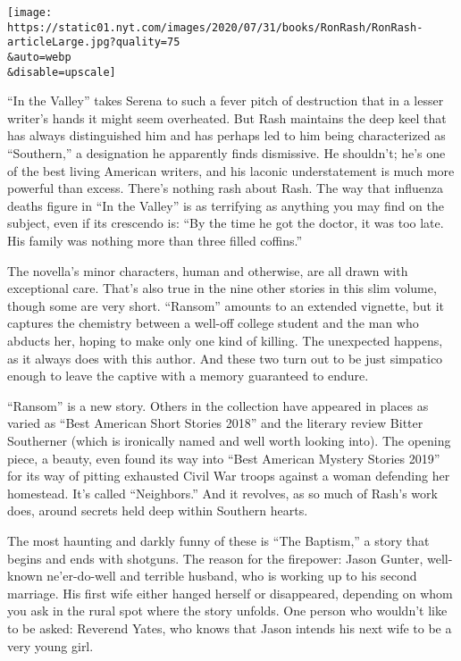 \texttt{[image: https://static01.nyt.com/images/2020/07/31/books/RonRash/RonRash-articleLarge.jpg?quality=75\\\&auto=webp\\\&disable=upscale]}

``In the Valley'' takes Serena to such a fever pitch of destruction that
in a lesser writer's hands it might seem overheated. But Rash maintains
the deep keel that has always distinguished him and has perhaps led to
him being characterized as ``Southern,'' a designation he apparently
finds dismissive. He shouldn't; he's one of the best living American
writers, and his laconic understatement is much more powerful than
excess. There's nothing rash about Rash. The way that influenza deaths
figure in ``In the Valley'' is as terrifying as anything you may find on
the subject, even if its crescendo is: ``By the time he got the doctor,
it was too late. His family was nothing more than three filled
coffins.''

The novella's minor characters, human and otherwise, are all drawn with
exceptional care. That's also true in the nine other stories in this
slim volume, though some are very short. ``Ransom'' amounts to an
extended vignette, but it captures the chemistry between a well-off
college student and the man who abducts her, hoping to make only one
kind of killing. The unexpected happens, as it always does with this
author. And these two turn out to be just simpatico enough to leave the
captive with a memory guaranteed to endure.

``Ransom'' is a new story. Others in the collection have appeared in
places as varied as ``Best American Short Stories 2018'' and the
literary review Bitter Southerner (which is ironically named and well
worth looking into). The opening piece, a beauty, even found its way
into ``Best American Mystery Stories 2019'' for its way of pitting
exhausted Civil War troops against a woman defending her homestead. It's
called ``Neighbors.'' And it revolves, as so much of Rash's work does,
around secrets held deep within Southern hearts.

The most haunting and darkly funny of these is ``The Baptism,'' a story
that begins and ends with shotguns. The reason for the firepower: Jason
Gunter, well-known ne'er-do-well and terrible husband, who is working up
to his second marriage. His first wife either hanged herself or
disappeared, depending on whom you ask in the rural spot where the story
unfolds. One person who wouldn't like to be asked: Reverend Yates, who
knows that Jason intends his next wife to be a very young girl.

